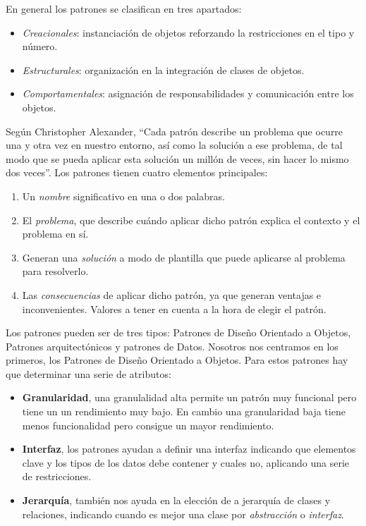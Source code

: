 \documentclass[10pt,a4paper,titlepage]{article}
\begin{document}
En general los patrones se clasifican en tres apartados:
\begin{itemize}
\item \textit{Creacionales}: instanciación de objetos reforzando la restricciones en el tipo y número.
\item \textit{Estructurales}: organización en la  integración de clases de objetos.
\item \textit{Comportamentales}: asignación de responsabilidades y comunicación entre  los objetos.
\end{itemize}

Según Christopher Alexander, ``Cada patrón describe un problema que ocurre una y otra vez en nuestro entorno, así como la solución a ese problema, de tal modo que se pueda aplicar esta solución un millón de veces, sin hacer lo mismo dos veces''. Los patrones tienen cuatro elementos principales:
\begin{enumerate}
\item Un \textit{nombre} significativo en una o dos palabras.
\item El \textit{problema}, que describe cuándo aplicar dicho patrón explica el contexto y el problema en sí. 
\item Generan una \textit{solución} a modo de plantilla que puede aplicarse al problema para resolverlo.
\item Las \textit{consecuencias} de aplicar dicho patrón, ya que generan ventajas e inconvenientes. Valores a tener en cuenta a la hora de elegir el patrón.
\end{enumerate}

Los patrones pueden ser de tres tipos: Patrones de Diseño Orientado a Objetos, Patrones arquitectónicos y patrones de Datos. Nosotros nos centramos en los primeros, los Patrones de Diseño Orientado a Objetos. Para estos patrones hay que determinar una serie de atributos:
\begin{itemize}
\item \textbf{Granularidad}, una granulalidad alta permite un patrón muy funcional pero tiene un un rendimiento muy bajo. En cambio una granularidad baja tiene menos funcionalidad pero consigue un mayor rendimiento.
\item \textbf{Interfaz}, los patrones ayudan a definir una interfaz indicando que  elementos clave y los tipos de los datos debe contener y cuales no, aplicando una serie de restricciones.
\item \textbf{Jerarquía}, también nos ayuda en la elección de a jerarquía de clases y relaciones, indicando cuando es mejor una clase por \textit{abstracción} o  \textit{interfaz}. 
\end{itemize} 
\end{document}
